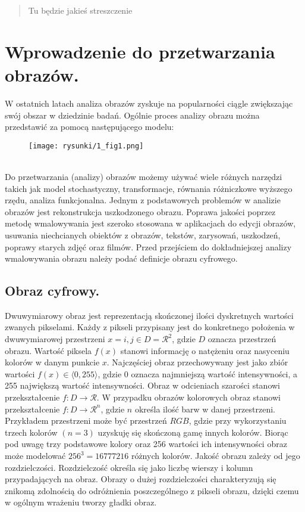 \documentclass[12pt, twoside, openany]{report}
\theoremstyle{definition}
\begin{document}
\begin{abstract}
Tu będzie jakieś streszczenie
\end{abstract}

\newpage
\printunsrtglossary[type=symbols, style=long, title={Wykaz oznaczeń i symboli}]
    

\chapter{Wprowadzenie do przetwarzania obrazów.}
W ostatnich latach analiza obrazów zyskuje na popularności ciągle zwiększając swój obszar w dziedzinie badań. Ogólnie proces analizy obrazu można przedstawić za pomocą następującego modelu: \\
\begin{figure}[!h]
	\centering
	\texttt{[image: rysunki/1\_fig1.png]}
\end{figure}
\\
Do przetwarzania (analizy) obrazów możemy używać wiele różnych narzędzi takich jak model stochastyczny, transformacje, równania różniczkowe wyższego rzędu, analiza funkcjonalna. Jednym z podstawowych problemów w analizie obrazów jest rekonstrukcja uszkodzonego obrazu. Poprawa jakości poprzez metodę wmalowywania jest szeroko stosowana w aplikacjach do edycji obrazów, usuwania niechcianych obiektów z obrazów, tekstów, zarysowań, uszkodzeń, poprawy starych zdjęć oraz filmów. Przed przejściem do dokładniejszej analizy wmalowywania obrazu należy podać definicje obrazu cyfrowego.
\section{Obraz cyfrowy.}
Dwuwymiarowy obraz jest reprezentacją skończonej ilości dyskretnych wartości zwanych pikselami. Każdy z pikseli przypisany jest do konkretnego położenia w dwuwymiarowej przestrzeni $x = {i,j} \in D=\mathcal{R}^2$, gdzie $D$ oznacza przestrzeń obrazu. Wartość piksela $f(x)$ stanowi informację o natężeniu oraz nasyceniu kolorów w danym punkcie $x$. Najczęściej obraz przechowywany jest jako zbiór wartości $f(x) \in \langle 0,255 \rangle$, gdzie 0 oznacza najmniejszą wartość intensywności, a 255 największą wartość intensywności. Obraz w odcieniach szarości stanowi przekształcenie $f: D \rightarrow \mathcal{R}$. W przypadku obrazów kolorowych obraz stanowi przekształcenie $f: D \rightarrow \mathcal{R}^n$, gdzie $n$ określa ilość barw w danej przestrzeni. Przykładem przestrzeni może być przestrzeń $RGB$, gdzie przy wykorzystaniu trzech kolorów $(n=3)$ uzyskuję się skończoną gamę innych kolorów. Biorąc pod uwagę trzy podstawowe kolory oraz 256 wartości ich intensywności obraz może modelować $256^3=16777216$ różnych kolorów. Jakość obrazu zależy od jego rozdzielczości. Rozdzielczość określa się jako liczbę wierszy i kolumn przypadających na obraz. Obrazy o dużej rozdzielczości charakteryzują się znikomą zdolnością do odróżnienia poszczególnego z pikseli obrazu, dzięki czemu w ogólnym wrażeniu tworzy gładki obraz.
\end{document}
